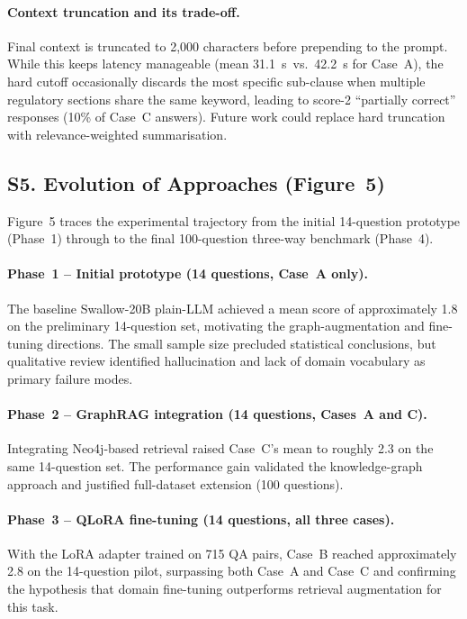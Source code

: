 \documentclass[twocolumn]{article}
\begin{document}
\paragraph{Context truncation and its trade-off.}
Final context is truncated to 2,000 characters before prepending to the prompt.
While this keeps latency manageable (mean 31.1~s~vs.\ 42.2~s for Case~A),
the hard cutoff occasionally discards the most specific sub-clause when multiple
regulatory sections share the same keyword, leading to score-2 ``partially correct''
responses (10\% of Case~C answers).
Future work could replace hard truncation with relevance-weighted summarisation.

\subsection*{S5. Evolution of Approaches (Figure~5)}

Figure~5 traces the experimental trajectory from the initial 14-question prototype
(Phase~1) through to the final 100-question three-way benchmark (Phase~4).

\paragraph{Phase~1 -- Initial prototype (14 questions, Case~A only).}
The baseline Swallow-20B plain-LLM achieved a mean score of approximately 1.8 on the
preliminary 14-question set, motivating the graph-augmentation and fine-tuning directions.
The small sample size precluded statistical conclusions, but qualitative review identified
hallucination and lack of domain vocabulary as primary failure modes.

\paragraph{Phase~2 -- GraphRAG integration (14 questions, Cases~A and C).}
Integrating Neo4j-based retrieval raised Case~C's mean to roughly 2.3 on the same
14-question set.
The performance gain validated the knowledge-graph approach and justified full-dataset
extension (100 questions).

\paragraph{Phase~3 -- QLoRA fine-tuning (14 questions, all three cases).}
With the LoRA adapter trained on 715 QA pairs, Case~B reached approximately 2.8 on the
14-question pilot, surpassing both Case~A and Case~C and confirming the hypothesis that
domain fine-tuning outperforms retrieval augmentation for this task.
\end{document}
